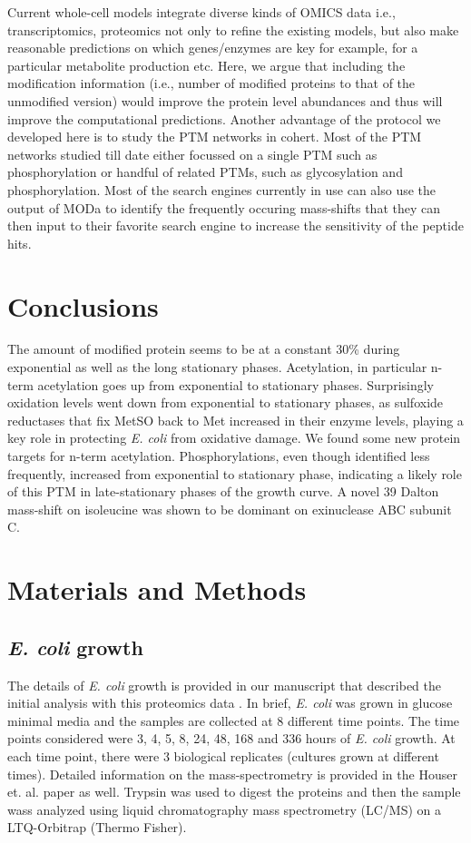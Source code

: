 \documentclass[12pt]{article}
\begin{document}
Current whole-cell models \cite{Covertetal2008} integrate diverse kinds of OMICS data i.e., transcriptomics, proteomics not only to refine the existing models, but also make reasonable predictions on which genes/enzymes are key for example, for a particular metabolite production etc. Here, we argue that including the modification information (i.e., number of modified proteins to that of the unmodified version) would improve the protein level abundances and thus will improve the computational predictions. Another advantage of the protocol we developed here is to study the PTM networks in cohert. Most of the PTM networks studied till date either focussed on a single PTM such as phosphorylation \cite{Olsenetal2006} or handful of related PTMs, such as glycosylation and phosphorylation. Most of the search engines currently in use can also use the output of MODa to identify the frequently occuring mass-shifts that they can then input to their favorite search engine to increase the sensitivity of the peptide hits.

\section{Conclusions}

The amount of modified protein seems to be at a constant 30\% during exponential as well as the long stationary phases. Acetylation, in particular n-term acetylation goes up from exponential to stationary phases. Surprisingly oxidation levels went down from exponential to stationary phases, as sulfoxide reductases that fix MetSO back to Met increased in their enzyme levels, playing a key role in protecting \emph{E. coli} from oxidative damage. We found some new protein targets for n-term acetylation. Phosphorylations, even though identified less frequently, increased from exponential to stationary phase, indicating a likely role of this PTM in late-stationary phases of the growth curve. A novel 39 Dalton mass-shift on isoleucine was shown to be dominant on exinuclease ABC subunit C. 


\section{Materials and Methods}

\subsection{\emph{E. coli} growth} 

The details of \emph{E. coli} growth is provided in our manuscript that described the initial analysis with this proteomics data \cite{Houseretal2015}. In brief, \emph{E. coli} was grown in glucose minimal media and the samples are collected at 8 different time points. The time points considered were 3, 4, 5, 8, 24, 48, 168 and 336 hours of \emph{E. coli} growth. At each time point, there were 3 biological replicates (cultures grown at different times). Detailed information on the mass-spectrometry is provided in the Houser et. al. paper \cite{Houseretal2015} as well. Trypsin was used to digest the proteins and then the sample wass analyzed using liquid chromatography mass spectrometry (LC/MS) on a LTQ-Orbitrap (Thermo Fisher). 
\end{document}
